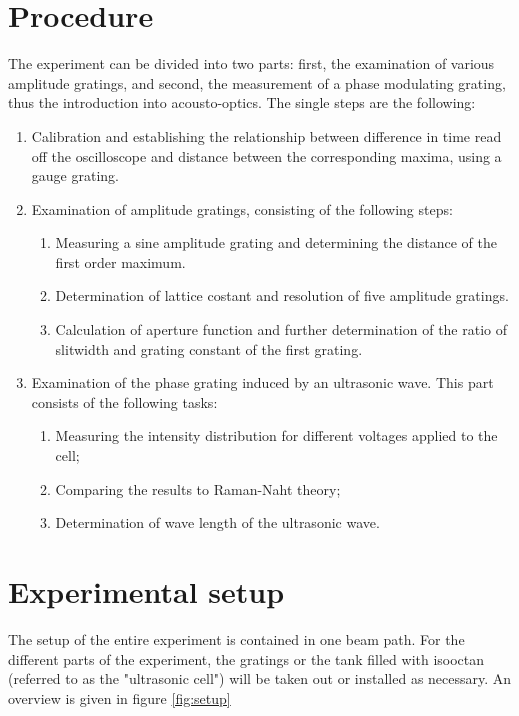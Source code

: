 \section{Procedure}
The experiment can be divided into two parts: first, the examination of various 
amplitude gratings, and second, the measurement of a phase modulating grating, 
thus the introduction into acousto-optics. The single steps are the following:
\begin{enumerate}
    \item
        Calibration and establishing the relationship between difference in time 
        read off the oscilloscope and distance between the corresponding maxima, 
        using a gauge grating.
    \item
        Examination of amplitude gratings, consisting of the following steps:
        \begin{enumerate}
            \item
                Measuring a sine amplitude grating and determining the distance of the first 
                order maximum.
            \item
                Determination of lattice costant and resolution of five amplitude gratings.
            \item
                Calculation of aperture function and further 
                determination of the ratio of slitwidth and grating constant of the first grating. 
        \end{enumerate}
        \item
            Examination of the phase grating induced by an ultrasonic wave. 
            This part consists of the following tasks:
        \begin{enumerate}
            \item
                Measuring the intensity distribution for different voltages applied to the cell;
            \item
                Comparing the results to Raman-Naht theory;
            \item
                Determination of wave length of the ultrasonic wave.
        \end{enumerate}
\end{enumerate}

\section{Experimental setup}
The setup of the entire experiment is contained in one beam path. 
For the different parts of the experiment, the gratings or the tank 
filled with isooctan (referred to as the "ultrasonic cell") will be 
taken out or installed as necessary. An overview is given in figure \ref{fig:setup}

